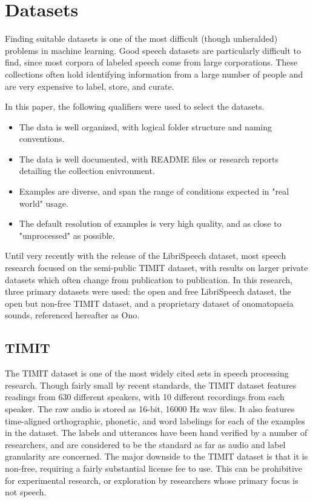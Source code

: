 \documentclass{article} %
\begin{document}
\section{Datasets}
Finding suitable datasets is one of the most difficult (though unheralded) 
problems in machine learning. Good speech datasets are particularly difficult
to find, since most corpora of labeled speech come from 
large corporations. These collections often hold identifying information from a large number of
people and are very expensive to label, store, and curate.
\par
In this paper, the following qualifiers were used to select the datasets.
\begin{itemize}
    \item The data is well organized, with logical folder structure and naming conventions.
    \item The data is well documented, with README files or research reports detailing the collection enivronment.
    \item Examples are diverse, and span the range of conditions expected in "real world" usage. 
    \item The default resolution of examples is very high quality, and as close to "unprocessed" as possible.
\end{itemize}

Until very recently
with the release of the LibriSpeech dataset, most speech research
focused on the semi-public TIMIT dataset, with results on larger private
datasets which often change from publication to publication. In this research,
three primary datasets were used: the open and free LibriSpeech dataset,
the open but non-free TIMIT dataset, and a proprietary dataset of onomatopaeia
sounds, referenced hereafter as Ono.
\subsection{TIMIT}
The TIMIT dataset is one of the most widely cited sets in speech processing research.
Though fairly small by recent standards, the TIMIT dataset features readings from 630 different speakers, with 10 different recordings from each speaker. The raw audio is stored as 16-bit, 16000 Hz wav files. It also features time-aligned orthographic, phonetic, and word labelings for
each of the examples in the dataset. The labels and utterances have been hand verified by a number of researchers, and are considered to be the standard as far as audio and label granularity are concerned. The major downside to the TIMIT dataset is that it is non-free,
requiring a fairly substantial license fee to use. This can be prohibitive
for experimental research, or exploration by researchers whose primary focus
is not speech.
\end{document}

